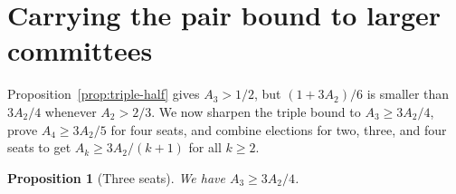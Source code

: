 \documentclass[11pt,letterpaper]{article}
\theoremstyle{cleanthm}
\newtheorem{proposition}[lemma]{Proposition}
\begin{document}

\newpage
\section[Larger committees]{Carrying the pair bound to larger committees}\label{sec:transfer}

Proposition~\ref{prop:triple-half} gives \(A_3>1/2\), but \((1+3A_2)/6\) is smaller than
\(3A_2/4\) whenever \(A_2>2/3\). We now sharpen the triple bound to \(A_3\ge 3A_2/4\), prove
\(A_4\ge 3A_2/5\) for four seats, and combine elections for two, three, and four seats to get
\(A_k\ge 3A_2/(k+1)\) for all \(k\ge 2\).

\begin{proposition}[Three seats]\label{prop:triple-transfer}
We have \(A_3\ge 3A_2/4\).
\end{proposition}
\end{document}
